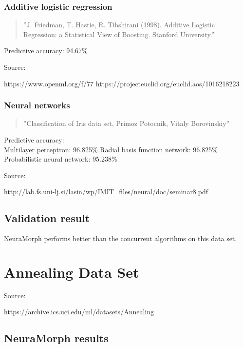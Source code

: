 \documentclass[8pt, a4paper]{article}
\begin{document}
\subsubsection{Additive logistic regression}

\begin{quote}
''J. Friedman, T. Hastie, R. Tibshirani (1998). Additive Logistic Regression: a Statistical View of Boosting. Stanford University.''
\end{quote}

Predictive accuracy: 94.67\%

Source:

https://www.openml.org/f/77
https://projecteuclid.org/euclid.aos/1016218223

\subsubsection{Neural networks}

\begin{quote}
''Classification of Iris data set, Primoz Potocnik, Vitaly Borovinskiy''
\end{quote}

Predictive accuracy:\\
Multilayer perceptron: 96.825\%
Radial basis function network: 96.825\%
Probabilistic neural network: 95.238\%

Source:

http://lab.fs.uni-lj.si/lasin/wp/IMIT\_files/neural/doc/seminar8.pdf

\subsection{Validation result}

NeuraMorph performs better than the concurrent algorithms on this data set.




\newpage
\section{Annealing Data Set}

Source: 

https://archive.ics.uci.edu/ml/datasets/Annealing

\subsection{NeuraMorph results}


\end{document}
